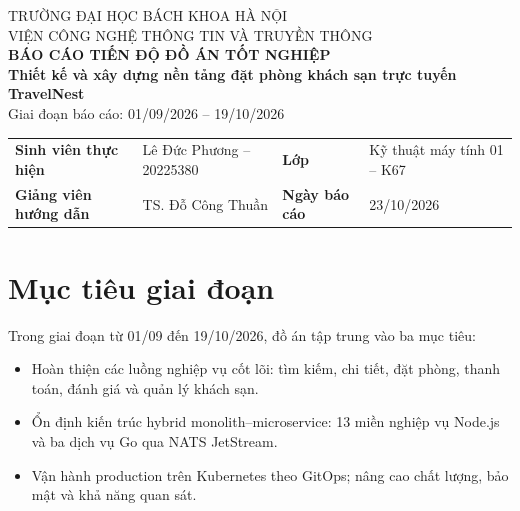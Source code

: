 \documentclass[12pt,a4paper]{article}
\begin{document}
\thispagestyle{empty}
\begin{center}
  {\small TRƯỜNG ĐẠI HỌC BÁCH KHOA HÀ NỘI}\\[1pt]
  {\small VIỆN CÔNG NGHỆ THÔNG TIN VÀ TRUYỀN THÔNG}\\[4pt]
  {\large\bfseries BÁO CÁO TIẾN ĐỘ ĐỒ ÁN TỐT NGHIỆP}\\[3pt]
  {\bfseries Thiết kế và xây dựng nền tảng đặt phòng khách sạn trực tuyến TravelNest}\\[1pt]
  {\small Giai đoạn báo cáo: 01/09/2026 -- 19/10/2026}
\end{center}

\vspace{-2pt}
\begin{center}
\footnotesize
\begin{tabularx}{\textwidth}{@{}>{\bfseries}p{3.9cm}X>{\bfseries}p{2.3cm}X@{}}
\toprule
Sinh viên thực hiện & Lê Đức Phương -- 20225380 & Lớp & Kỹ thuật máy tính 01 -- K67 \\
Giảng viên hướng dẫn & TS. Đỗ Công Thuần & Ngày báo cáo & 23/10/2026 \\
\bottomrule
\end{tabularx}
\end{center}

\par
{}\par
{}

\section{Mục tiêu giai đoạn}

Trong giai đoạn từ 01/09 đến 19/10/2026, đồ án tập trung vào ba mục tiêu:
\begin{itemize}
  \item Hoàn thiện các luồng nghiệp vụ cốt lõi: tìm kiếm, chi tiết, đặt phòng, thanh toán, đánh giá và quản lý khách sạn.
  \item Ổn định kiến trúc hybrid monolith--microservice: 13 miền nghiệp vụ Node.js và ba dịch vụ Go qua NATS JetStream.
  \item Vận hành production trên Kubernetes theo GitOps; nâng cao chất lượng, bảo mật và khả năng quan sát.
\end{itemize}
\end{document}
